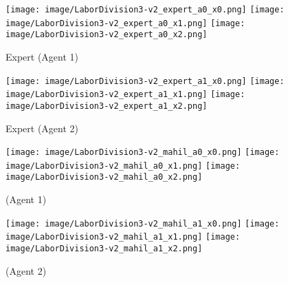 
\begin{figure*}[t]
  \def\subfwid{.45}
  \def\figwid{.3}
  \centering
  \begin{subfigure}[t]{\subfwid\linewidth}
      \centering
      \texttt{[image: image/LaborDivision3-v2\_expert\_a0\_x0.png]}\hspace{0.5ex}
      \texttt{[image: image/LaborDivision3-v2\_expert\_a0\_x1.png]}\hspace{0.5ex}
      \texttt{[image: image/LaborDivision3-v2\_expert\_a0\_x2.png]}
      \caption{Expert (Agent 1)}
      \label{fig: expert a1 visualization}
  \end{subfigure}
  \hspace{1ex}
  \begin{subfigure}[t]{\subfwid\linewidth}
      \centering
      \texttt{[image: image/LaborDivision3-v2\_expert\_a1\_x0.png]}\hspace{0.5ex}
      \texttt{[image: image/LaborDivision3-v2\_expert\_a1\_x1.png]}\hspace{0.5ex}
      \texttt{[image: image/LaborDivision3-v2\_expert\_a1\_x2.png]}
      \caption{Expert (Agent 2)}
  \end{subfigure}
  \par\bigskip 
  \begin{subfigure}[t]{\subfwid\linewidth}
      \centering
      \texttt{[image: image/LaborDivision3-v2\_mahil\_a0\_x0.png]}\hspace{0.5ex}
      \texttt{[image: image/LaborDivision3-v2\_mahil\_a0\_x1.png]}\hspace{0.5ex}
      \texttt{[image: image/LaborDivision3-v2\_mahil\_a0\_x2.png]}
      \caption{\ouralg (Agent 1)}
  \end{subfigure}
  \hspace{1ex}
  \begin{subfigure}[t]{\subfwid\linewidth}
      \centering
      \texttt{[image: image/LaborDivision3-v2\_mahil\_a1\_x0.png]}\hspace{0.5ex}
      \texttt{[image: image/LaborDivision3-v2\_mahil\_a1\_x1.png]}\hspace{0.5ex}
      \texttt{[image: image/LaborDivision3-v2\_mahil\_a1\_x2.png]}
      \caption{\ouralg (Agent 2)}

\end{subfigure}
\end{figure*}
